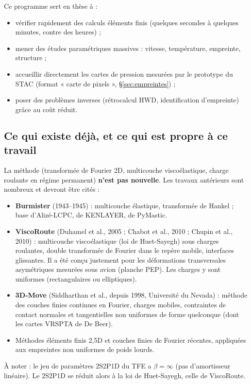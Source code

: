 \documentclass[11pt,a4paper]{article}
\begin{document}
Ce programme sert en thèse à :
\begin{itemize}[nosep]
  \item vérifier rapidement des calculs éléments finis (quelques secondes à quelques minutes, contre des heures) ;
  \item mener des études paramétriques massives : vitesse, température, empreinte, structure ;
  \item accueillir directement les cartes de pression mesurées par le prototype du STAC
        (format « carte de pixels », \S\ref{sec:empreintes}) ;
  \item poser des problèmes inverses (rétrocalcul HWD, identification d'empreinte) grâce au coût réduit.
\end{itemize}

\subsection{Ce qui existe déjà, et ce qui est propre à ce travail}\label{sec:originalite}
La méthode (transformée de Fourier 2D, multicouche viscoélastique, charge roulante en régime
permanent) \textbf{n'est pas nouvelle}. Les travaux antérieurs sont nombreux et devront être cités :
\begin{itemize}[nosep]
  \item \textbf{Burmister} (1943--1945) : multicouche élastique, transformée de Hankel ; base
        d'Alizé-LCPC, de KENLAYER, de PyMastic.
  \item \textbf{ViscoRoute} (Duhamel et al., 2005 ; Chabot et al., 2010 ; Chupin et al., 2010) :
        multicouche viscoélastique (loi de Huet-Sayegh) sous charges roulantes, double transformée de
        Fourier dans le repère mobile, interfaces glissantes. Il a été conçu justement pour les
        déformations transversales asymétriques mesurées sous avion (planche PEP). Les charges y
        sont uniformes (rectangulaires ou elliptiques).
  \item \textbf{3D-Move} (Siddharthan et al., depuis 1998, Université du Nevada) : méthode des couches
        finies continues en Fourier, charges mobiles, contraintes de contact normales et
        tangentielles non uniformes de forme quelconque (dont les cartes VRSPTA de De Beer).
  \item Méthodes éléments finis 2,5D et couches finies de Fourier récentes, appliquées aux
        empreintes non uniformes de poids lourds.
\end{itemize}
À noter : le jeu de paramètres 2S2P1D du TFE a $\beta=\infty$ (pas d'amortisseur linéaire). Le
2S2P1D se réduit alors à la loi de Huet-Sayegh, celle de ViscoRoute.
\end{document}
